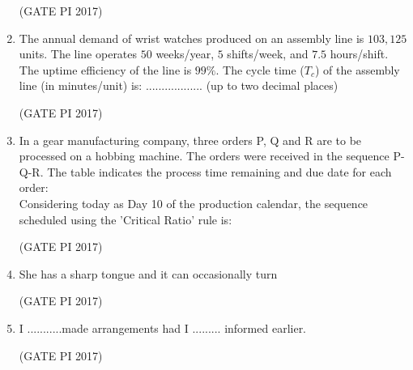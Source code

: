 \documentclass[journal,12pt,onecolumn]{IEEEtran}
\theoremstyle{remark}
\begin{document}
\begin{enumerate}
\hfill (GATE PI 2017)

\item The annual demand of wrist watches produced on an assembly line is $103{,}125$ units.  
The line operates $50$ weeks/year, $5$ shifts/week, and $7.5$ hours/shift.  
The uptime efficiency of the line is $99\%$.  
The cycle time ($T_c$) of the assembly line (in minutes/unit) is:  
.................. (up to two decimal places)  

\hfill (GATE PI 2017)

\item In a gear manufacturing company, three orders P, Q and R are to be processed on a hobbing machine.  
The orders were received in the sequence P\--Q\--R. The table indicates the process time remaining and due date for each order: \\




Considering today as Day 10 of the production calendar,  
the sequence scheduled using the 'Critical Ratio' rule is:
\begin{enumerate}
\end{enumerate}
\hfill (GATE PI 2017)

\item She has a sharp tongue and it can occasionally turn
\begin{enumerate}
\end{enumerate}
\hfill (GATE PI 2017)

\item I ...........made arrangements had I ......... informed earlier.
\begin{enumerate}
\end{enumerate}
\hfill (GATE PI 2017)


\end{enumerate}
\end{document}
